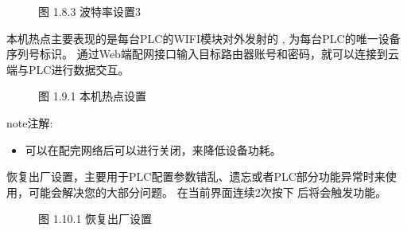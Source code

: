 \documentclass[a4paper,10pt,english]{sphinxmanual}
\begin{document}
\begin{figure}[htbp]
\centering
\capstart

\noindent{}
\caption{图 1.8.3 波特率设置3}\label{\detokenize{operation_guide:id24}}\end{figure}

\sphinxAtStartPar
{}

\sphinxAtStartPar
本机热点主要表现的是每台PLC的WIFI模块对外发射的 , 为每台PLC的唯一设备序列号标识。
通过Web端配网接口输入目标路由器账号和密码，就可以连接到云端与PLC进行数据交互。

\begin{figure}[htbp]
\centering
\capstart

\noindent{}
\caption{图 1.9.1 本机热点设置}\label{\detokenize{operation_guide:id25}}\end{figure}

\begin{sphinxadmonition}{note}{注解:}\begin{itemize}
\item {} 
\sphinxAtStartPar
{} 可以在配完网络后可以进行关闭，来降低设备功耗。

\end{itemize}
\end{sphinxadmonition}

\sphinxAtStartPar
{}

\sphinxAtStartPar
恢复出厂设置，主要用于PLC配置参数错乱、遗忘或者PLC部分功能异常时来使用，可能会解决您的大部分问题。
在当前界面连续2次按下  后将会触发功能。

\begin{figure}[htbp]
\centering
\capstart

\noindent{}
\caption{图 1.10.1 恢复出厂设置}\label{\detokenize{operation_guide:id26}}\end{figure}
\end{document}
